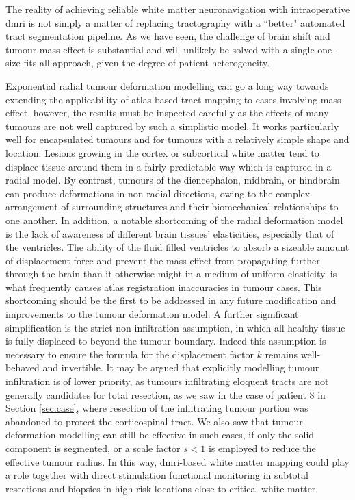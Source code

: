 The reality of achieving reliable white matter neuronavigation with intraoperative \gls{dmri} is not simply a matter of replacing tractography with a ``better" automated tract segmentation pipeline.
As we have seen, the challenge of brain shift and tumour mass effect is substantial and will unlikely be solved with a single one-size-fits-all approach, given the degree of patient heterogeneity.

Exponential radial tumour deformation modelling can go a long way towards extending the applicability of atlas-based tract mapping to cases involving mass effect, however, the results must be inspected carefully as the effects of many tumours are not well captured by such a simplistic model.
It works particularly well for encapsulated tumours and for tumours with a relatively simple shape and location:
Lesions growing in the cortex or subcortical white matter tend to displace tissue around them in a fairly predictable way which is captured in a radial model.
By contrast, tumours of the diencephalon, midbrain, or hindbrain can produce deformations in non-radial directions, owing to the complex arrangement of surrounding structures and their biomechanical relationships to one another.
In addition, a notable shortcoming of the radial deformation model is the lack of awareness of different brain tissues' elasticities, especially that of the ventricles.
The ability of the fluid filled ventricles to absorb a sizeable amount of displacement force and prevent the mass effect from propagating further through the brain than it otherwise might in a medium of uniform elasticity, is what frequently causes atlas registration inaccuracies in tumour cases.
This shortcoming should be the first to be addressed in any future modification and improvements to the tumour deformation model.
A further significant simplification is the strict non-infiltration assumption, in which all healthy tissue is fully displaced to beyond the tumour boundary.
Indeed this assumption is necessary to ensure the formula for the displacement factor $k$ remains well-behaved and invertible.
It may be argued that explicitly modelling tumour infiltration is of lower priority, as tumours infiltrating eloquent tracts are not generally candidates for total resection, as we saw in the case of patient 8 in Section \ref{sec:case}, where resection of the infiltrating tumour portion was abandoned to protect the corticospinal tract.
We also saw that tumour deformation modelling can still be effective in such cases, if only the solid component is segmented, or a scale factor $s<1$ is employed to reduce the effective tumour radius.
In this way, \gls{dmri}-based white matter mapping could play a role together with direct stimulation functional monitoring in subtotal resections and biopsies in high risk locations close to critical white matter.

